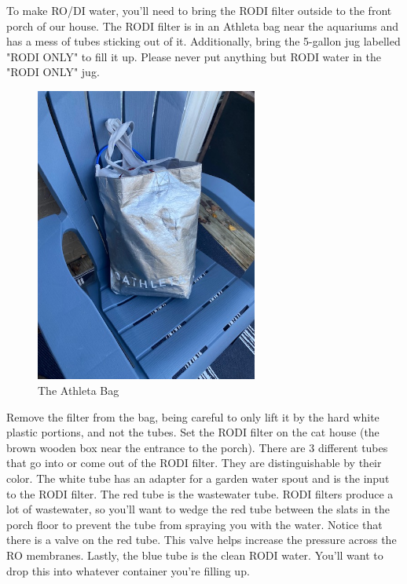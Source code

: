 \documentclass{report}
\begin{document}
To make RO/DI water, you'll need to bring the RODI filter outside to the front porch of our house. The RODI filter is in an
Athleta bag near the aquariums and has a mess of tubes sticking out of it. Additionally, bring the 5-gallon jug labelled
"RODI ONLY" to fill it up. Please never put anything but RODI water in the "RODI ONLY" jug. 


\begin{figure}[H]
    \centering
    \includegraphics[width=0.65\textwidth, angle=-90]{RodiBag.jpg}
    \caption{The Athleta Bag}
\end{figure}

Remove the filter from the bag, being careful to only lift it by the hard white plastic portions, and not the tubes. 
Set the RODI filter on the cat house (the brown wooden box near the entrance to the porch). There are 3 different tubes that
go into or come out of the RODI filter. They are distinguishable by their color. The white tube has an adapter for a garden
water spout and is the input to the RODI filter. The red tube is the wastewater tube. RODI filters produce a lot of
wastewater, so you'll want to wedge the red tube between the slats in the porch floor to prevent the tube from spraying you 
with the water. Notice that there is a valve on the red tube. This valve helps increase the pressure across the RO membranes.
Lastly, the blue tube is the clean RODI water. You'll want to drop this into whatever container you're filling up.
\end{document}
